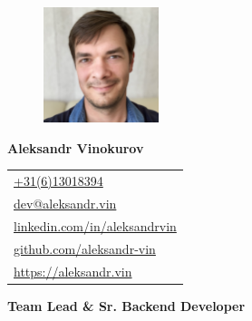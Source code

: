 \documentclass[letterpaper, 11pt]{article}
\begin{document}
\begin{figure} %
  \vspace{-5ex} %
  \includegraphics[width=0.3\textwidth]{me.jpg} %
\end{figure}

\noindent\textbf{\Huge Aleksandr Vinokurov}

\vspace{1em}

\noindent
\begin{tabular}{@{\hspace{5mm}}l}
\href{tel:+31613018394}{\url{+31(6)13018394}} \\
\href{mailto:dev@aleksandr.vin}{\url{dev@aleksandr.vin}} \\
\href{https://linkedin.com/in/aleksandrvin}{\url{linkedin.com/in/aleksandrvin}} \\
\href{https://github.com/aleksandr-vin}{\url{github.com/aleksandr-vin}} \\
\href{https://aleksandr.vin}{\url{https://aleksandr.vin}}
\end{tabular}

\vspace{1em}

\noindent\parbox{\linewidth}{\raggedright\textbf{\Large Team Lead \& Sr. Backend Developer}} %

\vspace{1em}











% 

\end{document}
